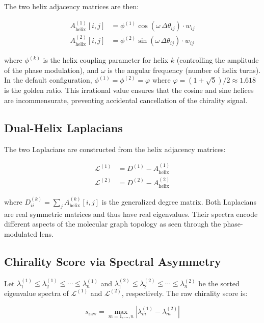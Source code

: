 \documentclass[11pt,a4paper]{article}
\begin{document}
The two helix adjacency matrices are then:

\begin{align}
  A_{\text{helix}}^{(1)}[i,j] &= \phi^{(1)} \cos(\omega \,\Delta\theta_{ij}) \cdot w_{ij} \\
  A_{\text{helix}}^{(2)}[i,j] &= \phi^{(2)} \sin(\omega \,\Delta\theta_{ij}) \cdot w_{ij}
\end{align}

where $\phi^{(k)}$ is the helix coupling parameter for helix $k$ (controlling the
amplitude of the phase modulation), and $\omega$ is the angular frequency
(number of helix turns). In the default configuration, $\phi^{(1)} = \phi^{(2)} = \varphi$
where $\varphi = (1 + \sqrt{5})/2 \approx 1.618$ is the golden ratio. This
irrational value ensures that the cosine and sine helices are incommensurate,
preventing accidental cancellation of the chirality signal.

\subsection{Dual-Helix Laplacians}

The two Laplacians are constructed from the helix adjacency matrices:

\begin{align}
  \mathcal{L}^{(1)} &= D^{(1)} - A_{\text{helix}}^{(1)} \\
  \mathcal{L}^{(2)} &= D^{(2)} - A_{\text{helix}}^{(2)}
\end{align}

where $D^{(k)}_{ii} = \sum_j A_{\text{helix}}^{(k)}[i,j]$ is the generalized
degree matrix. Both Laplacians are real symmetric matrices and thus have real
eigenvalues. Their spectra encode different aspects of the molecular graph
topology as seen through the phase-modulated lens.

\subsection{Chirality Score via Spectral Asymmetry}

Let $\lambda^{(1)}_1 \le \lambda^{(1)}_2 \le \cdots \le \lambda^{(1)}_n$ and
$\lambda^{(2)}_1 \le \lambda^{(2)}_2 \le \cdots \le \lambda^{(2)}_n$ be the
sorted eigenvalue spectra of $\mathcal{L}^{(1)}$ and $\mathcal{L}^{(2)}$,
respectively. The raw chirality score is:

\begin{equation}
  s_{\text{raw}} = \max_{m=1,\ldots,n} \left|\lambda^{(1)}_m - \lambda^{(2)}_m\right|
\end{equation}
\end{document}
